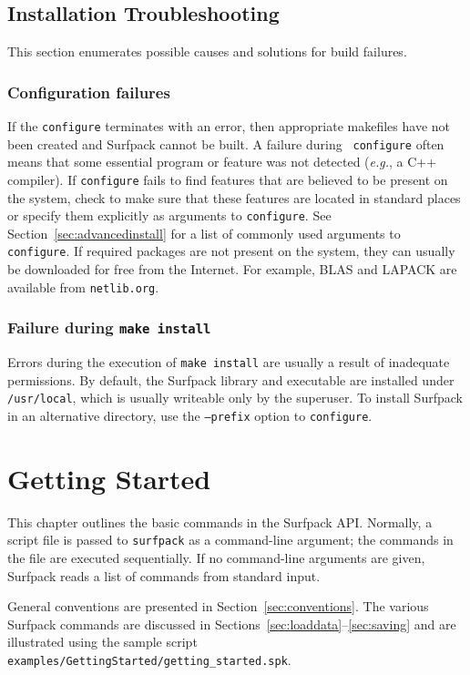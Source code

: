 \documentclass{article}
\begin{document}
\subsection{Installation Troubleshooting}\label{sec:installtrouble}
This section enumerates possible causes and solutions for build failures.
\subsubsection{Configuration failures}
If the \texttt{configure} terminates with an error, then appropriate makefiles
have not been created and Surfpack cannot be built.  A failure during \texttt{ 
configure} often means that some essential program or feature was not
detected ({\em e.g.}, a C++ compiler). If \texttt{configure} fails to find features that are
believed to be present on the system, check to make sure that these features are
located in standard places or specify them explicitly as arguments to \texttt{configure}.
See Section~\ref{sec:advancedinstall} for a list of commonly used arguments to \texttt{configure}.  If required
packages are not present on the system, they can usually be downloaded for free
from the Internet.  For example, BLAS and LAPACK are available from \texttt{netlib.org}.
\subsubsection{Failure during \texttt{make install}}
Errors during the execution of \texttt{make install} are usually a result of inadequate permissions. By default, the
Surfpack library and executable are installed under \texttt{/usr/local}, which is usually
writeable only by the superuser.  To install Surfpack in an alternative
directory, use the \texttt{--prefix} option to \texttt{configure}. 

\section{Getting Started}
This chapter outlines the basic commands in the Surfpack API.  Normally, a script file
is passed to \texttt{surfpack} as a command-line argument; the commands in
the file are executed sequentially.  If no command-line arguments are given,
Surfpack reads a list of commands from standard input.

General conventions are presented in Section~\ref{sec:conventions}.  The various Surfpack commands
are discussed in Sections~\ref{sec:loaddata}--\ref{sec:saving} and are illustrated using the sample script \texttt{examples/GettingStarted/getting\_started.spk}.  
\end{document}
